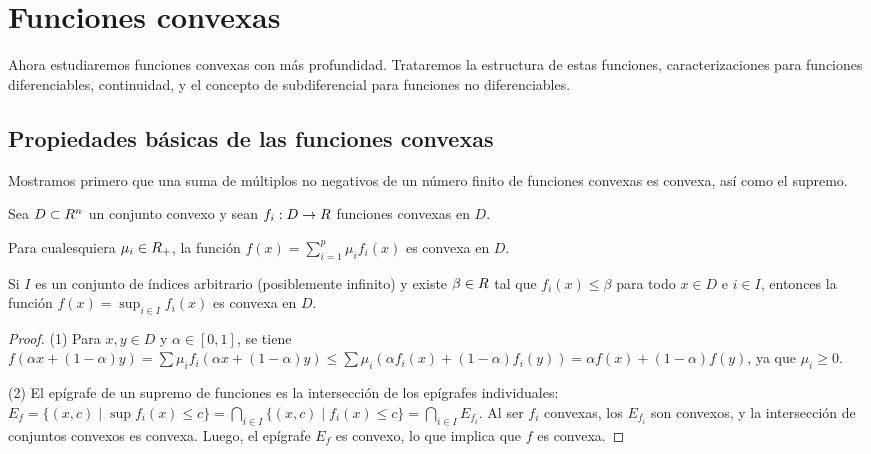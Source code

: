 
\section{Funciones convexas}
\label{v1:sec:3.4}

Ahora estudiaremos funciones convexas con más profundidad. Trataremos la estructura de estas funciones, caracterizaciones para funciones diferenciables, continuidad, y el concepto de subdiferencial para funciones no diferenciables.

\subsection{Propiedades básicas de las funciones convexas}

Mostramos primero que una suma de múltiplos no negativos de un número finito de funciones convexas es convexa, así como el supremo.

\begin{proposition}\label{v1:prop:3.4.1}
 Sea $D \subset R^n$ un conjunto convexo y sean $f_i : D \to R$ funciones convexas en $D$.
 \begin{enuthm}
 \item Para cualesquiera $\mu_i \in R_+$, la función $f(x) = \sum_{i=1}^p \mu_i f_i(x)$ es convexa en $D$.
 \item Si $I$ es un conjunto de índices arbitrario (posiblemente infinito) y existe $\beta \in R$ tal que $f_i(x) \le \beta$ para todo $x \in D$ e $i \in I$, entonces la función $f(x) = \sup_{i \in I} f_i(x)$ es convexa en $D$.
 \end{enuthm}
\end{proposition}

\begin{proof}
 (1) Para $x, y \in D$ y $\alpha \in [0,1]$, se tiene $f(\alpha x + (1-\alpha)y) = \sum \mu_i f_i(\alpha x + (1-\alpha)y) \le \sum \mu_i (\alpha f_i(x) + (1-\alpha)f_i(y)) = \alpha f(x) + (1-\alpha)f(y)$, ya que $\mu_i \ge 0$.
 
 (2) El epígrafe de un supremo de funciones es la intersección de los epígrafes individuales: $E_f = \{(x,c) \mid \sup f_i(x) \le c\} = \bigcap_{i \in I} \{(x,c) \mid f_i(x) \le c\} = \bigcap_{i \in I} E_{f_i}$. Al ser $f_i$ convexas, los $E_{f_i}$ son convexos, y la intersección de conjuntos convexos es convexa. Luego, el epígrafe $E_f$ es convexo, lo que implica que $f$ es convexa.
\end{proof}


